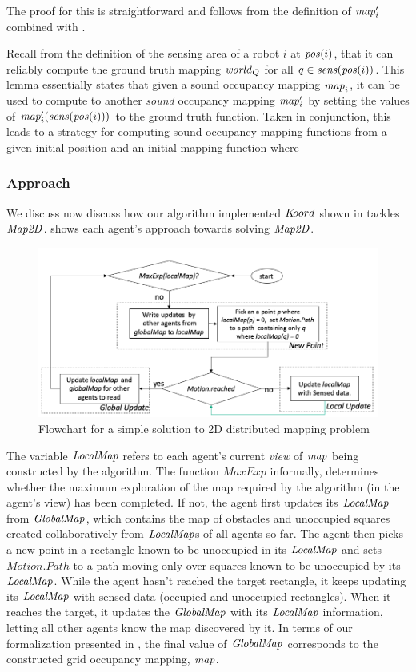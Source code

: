 The proof for this is straightforward and follows from the definition of $\mathit{map}^\prime_i$ combined with .

Recall from the definition of the sensing area of a robot $i$ at $\mathit{pos}(i)$, that it can reliably compute the ground truth mapping $\mathit{world}_Q$ for all $q \in \mathit{sens}(\mathit{pos}(i))$. This lemma essentially states that given a sound occupancy mapping $\mathit{map}_i$, it can be used to compute to another \emph{sound} occupancy mapping $\mathit{map}^\prime_i$ by setting the values of $\mathit{map}^\prime_i(\mathit{sens}(\mathit{pos}(i)))$ to the ground truth function. Taken in conjunction, this leads to a strategy for computing sound occupancy mapping functions from a given initial position and an initial mapping function where

\subsubsection{Approach}
We discuss now discuss how our algorithm implemented $K\kern-2pt oord$ shown in  tackles $\mathit{Map2D}$.  shows each agent's approach towards solving $\mathit{Map2D}$. 

\begin{figure}[!htbp]
    \centering
    \includegraphics[width=\linewidth]{figs/map_flowchart.png}
    \caption{Flowchart for a simple solution to 2D distributed mapping problem\vspace{-2mm}}
    \label{fig:flowmap}
\end{figure}

The variable $\mathit{LocalMap}$ refers to each agent's current \emph{view} of $\mathit{map}$ being constructed by the algorithm. The function $\mathit{MaxExp}$ informally, determines whether the maximum exploration of the map required by the algorithm (in the agent's view) has been completed. If not, the agent first updates its $\mathit{LocalMap}$ from $\mathit{GlobalMap}$, which contains the map of obstacles and unoccupied squares created collaboratively from $\mathit{LocalMap}$s of all agents so far. The agent then picks a new point in a rectangle known to be unoccupied in its $\mathit{LocalMap}$ and sets $\mathit{Motion.Path}$ to a path moving only over squares known to be unoccupied by its $\mathit{LocalMap}$. While the agent hasn't reached the target rectangle, it keeps updating its $\mathit{LocalMap}$ with sensed data (occupied and unoccupied rectangles). When it reaches the target, it updates the $\mathit{GlobalMap}$ with its $\mathit{LocalMap}$ information, letting all other agents know the map discovered by it. In terms of our formalization presented in , the final value of $\mathit{GlobalMap}$ corresponds to the constructed grid occupancy mapping, $\mathit{map}$. 



